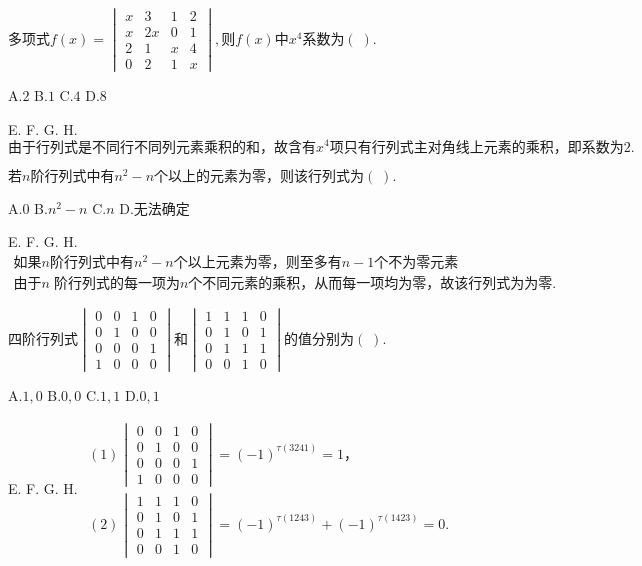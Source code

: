 $\mathrm{多项式}f(x)=\begin{vmatrix}x&3&1&2\\x&2x&0&1\\2&1&x&4\\0&2&1&x\end{vmatrix},则f(x)中x^4\mathrm{系数为}(\;).$

A.$2$   B.$1$   C.$4$   D.$8$

E.   F.   G.   H.
$\mathrm{由于行列式是不同行不同列元素乘积的和}，\mathrm{故含有}x^4\mathrm{项只有行列式主对角线上元素的乘积}，\mathrm{即系数为}2.$


$若n\mathrm{阶行列式中有}n^2-n\mathrm{个以上的元素为零}，\mathrm{则该行列式为}(\;).$

A.$0$   B.$n^2-n$   C.$n$   D.$\mathrm{无法确定}$

E.   F.   G.   H.
$\begin{array}{l}\mathrm{如果}n\mathrm{阶行列式中有}n^2-n\mathrm{个以上元素为零}，\mathrm{则至多有}n-1\mathrm{个不为零元素}\\\mathrm{由于}n\;\mathrm{阶行列式的每一项为}n\mathrm{个不同元素的乘积}，\mathrm{从而每一项均为零}，\mathrm{故该行列式为为零}.\end{array}$


$\mathrm{四阶行列式}\begin{vmatrix}0&0&1&0\\0&1&0&0\\0&0&0&1\\1&0&0&0\end{vmatrix}和\begin{vmatrix}1&1&1&0\\0&1&0&1\\0&1&1&1\\0&0&1&0\end{vmatrix}\mathrm{的值分别为}(\;).$

A.$1,0$   B.$0,0$   C.$1,1$   D.$0,1$

E.   F.   G.   H.
$\begin{array}{l}(1)\begin{vmatrix}0&0&1&0\\0&1&0&0\\0&0&0&1\\1&0&0&0\end{vmatrix}=(-1)^{\tau(3241)}=1，\\(2)\begin{vmatrix}1&1&1&0\\0&1&0&1\\0&1&1&1\\0&0&1&0\end{vmatrix}=(-1)^{\tau(1243)}+(-1)^{\tau(1423)}=0.\end{array}$


